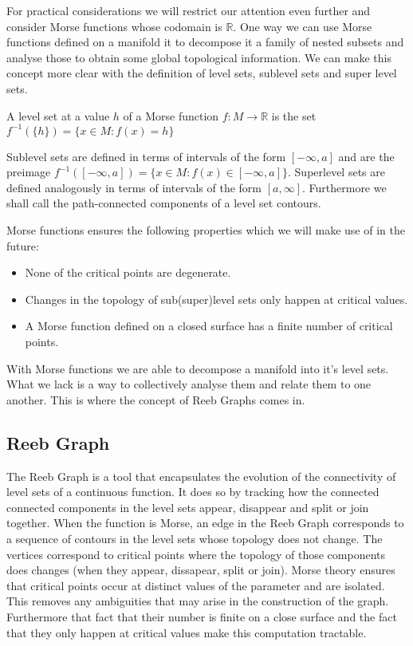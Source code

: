 For practical considerations we will restrict our attention even further and consider Morse functions whose codomain is $\mathbb{R}$. One way we can use Morse functions defined on a manifold it to decompose it a family of nested subsets and analyse those to obtain some global topological information. We can make this concept more clear with the definition of level sets, sublevel sets and super level sets.

\begin{defn} A level set at a value $h$ of a Morse function $f: M \to \mathbb{R}$ is the set $f^{-1}(\{h\}) = \{x \in M: f(x) = h \}$   \end{defn}

Sublevel sets are defined in terms of intervals of the form $[-\infty, a]$ and are the preimage $f^{-1}([-\infty, a]) = \{x \in M: f(x) \in [-\infty, a] \}$. Superlevel sets are defined analogously in terms of intervals of the form $[a, \infty]$. Furthermore we shall call the path-connected components of a level set contours.

Morse functions ensures the following properties which we will make use of in the future:

\begin{itemize}
    \item None of the critical points are degenerate.
    \item Changes in the topology of sub(super)level sets only happen at critical values. 
    \item A Morse function defined on a closed surface has a finite number of critical points.
\end{itemize}

With Morse functions we are able to decompose a manifold into it's level sets. What we lack is a way to collectively analyse them and relate them to one another. This is where the concept of Reeb Graphs comes in.

\subsection{Reeb Graph}


The Reeb Graph is a tool that encapsulates the evolution of the connectivity of level sets of a continuous function. It does so by tracking how the connected connected components in the level sets appear, disappear and split or join together. When the function is Morse, an edge in the Reeb Graph corresponds to a sequence of contours in the level sets whose topology does not change. The vertices correspond to critical points where the topology of those components does changes (when they appear, dissapear, split or join). Morse theory ensures that critical points occur at distinct values of the parameter and are isolated. This removes any ambiguities that may arise in the construction of the graph. Furthermore that fact that their number is finite on a close surface and the fact that they only happen at critical values make this computation tractable.

